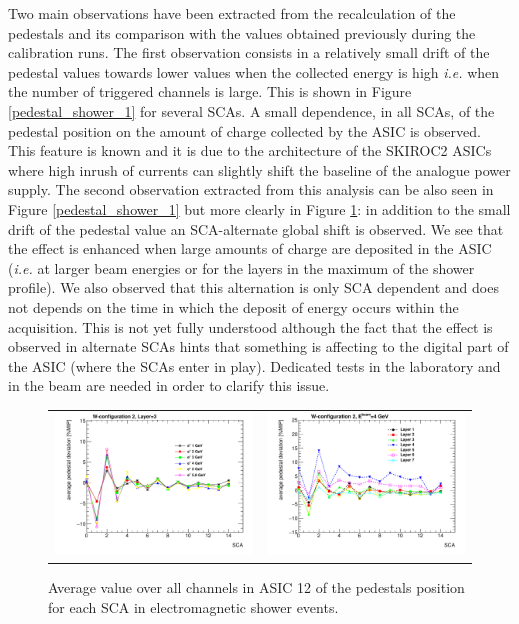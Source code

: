 \documentclass[a4paper,11pt]{article}
\begin{document}
Two main observations have been extracted from the recalculation of the pedestals and its comparison
with the values obtained previously during the calibration runs. The first observation
consists in a relatively small 
drift of the pedestal values
towards lower values when the collected energy is high {\it i.e.} when the number of triggered channels is large.
This is shown in Figure \ref{pedestal_shower_1} for several SCAs.
A small dependence, in all SCAs, of the pedestal position on the amount of charge collected by the
ASIC is observed.
This feature is known and it is due to the architecture of the SKIROC2 ASICs 
where high inrush of currents can slightly shift the baseline of the analogue power supply. 
The second observation extracted from this analysis can be also seen in Figure \ref{pedestal_shower_1} but
more clearly in Figure \ref{pedestal_shower_2}: in addition
to the small drift of the pedestal value an SCA-alternate global shift
is observed. We see that the effect is enhanced when large amounts of charge
are deposited in the ASIC ({\it i.e.} at larger beam energies or for the layers in the maximum of the shower
profile). We also observed that this alternation is only SCA dependent and does not depends
on the time in which the deposit of energy occurs within the acquisition.
This is not yet fully understood although the fact that the effect is observed in
alternate SCAs hints that something is affecting to the digital part of the ASIC 
(where the SCAs enter in play).
Dedicated tests in the laboratory and in the beam are needed in order to clarify this issue.

\begin{figure}[!t]
  \centering 
    \begin{tabular}{ll}
      \includegraphics[width=2.8in]{pedestal_deviation_layer3-eps-converted-to.pdf} & \includegraphics[width=2.8in]{pedestal_deviation_4GeV-eps-converted-to.pdf} \\
    \end{tabular}
    \caption{Average value over all channels in ASIC 12 of the pedestals position for each SCA in electromagnetic shower events.}
\label{pedestal_shower_2}
\end{figure}
\end{document}
